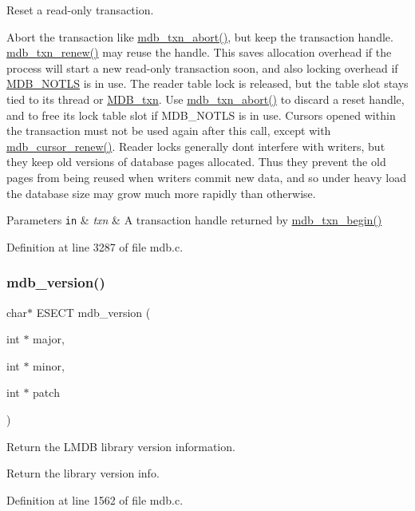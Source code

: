 Reset a read-\/only transaction. 

Abort the transaction like \mbox{\hyperlink{group__mdb_ga73a5938ae4c3239ee11efa07eb22b882}{mdb\+\_\+txn\+\_\+abort()}}, but keep the transaction handle. \mbox{\hyperlink{group__mdb_ga6c6f917959517ede1c504cf7c720ce6d}{mdb\+\_\+txn\+\_\+renew()}} may reuse the handle. This saves allocation overhead if the process will start a new read-\/only transaction soon, and also locking overhead if \mbox{\hyperlink{group__mdb__env_ga5dca84a576d14b4bfe2deddc2dc622d3}{M\+D\+B\+\_\+\+N\+O\+T\+LS}} is in use. The reader table lock is released, but the table slot stays tied to its thread or \mbox{\hyperlink{struct_m_d_b__txn}{M\+D\+B\+\_\+txn}}. Use \mbox{\hyperlink{group__mdb_ga73a5938ae4c3239ee11efa07eb22b882}{mdb\+\_\+txn\+\_\+abort()}} to discard a reset handle, and to free its lock table slot if M\+D\+B\+\_\+\+N\+O\+T\+LS is in use. Cursors opened within the transaction must not be used again after this call, except with \mbox{\hyperlink{group__mdb_gac8b57befb68793070c85ea813df481af}{mdb\+\_\+cursor\+\_\+renew()}}. Reader locks generally don\textquotesingle{}t interfere with writers, but they keep old versions of database pages allocated. Thus they prevent the old pages from being reused when writers commit new data, and so under heavy load the database size may grow much more rapidly than otherwise. 
\begin{DoxyParams}[1]{Parameters}
\mbox{\tt in}  & {\em txn} & A transaction handle returned by \mbox{\hyperlink{group__mdb_gad7ea55da06b77513609efebd44b26920}{mdb\+\_\+txn\+\_\+begin()}} \\
\hline
\end{DoxyParams}


Definition at line 3287 of file mdb.\+c.

\mbox{\label{group__internal_ga07dab844f4efddc9f2ce36dcb309ac9a}} 
\subsubsection{\texorpdfstring{mdb\+\_\+version()}{mdb\_version()}}
{\footnotesize\ttfamily char$\ast$ E\+S\+E\+CT mdb\+\_\+version (\begin{DoxyParamCaption}\item[{int $\ast$}]{major,  }\item[{int $\ast$}]{minor,  }\item[{int $\ast$}]{patch }\end{DoxyParamCaption})}



Return the L\+M\+DB library version information. 

Return the library version info. 

Definition at line 1562 of file mdb.\+c.


